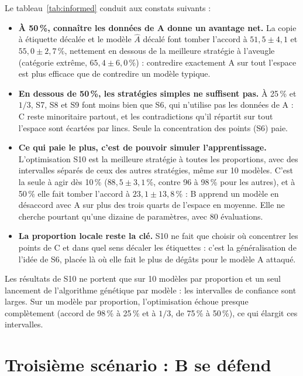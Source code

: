 \documentclass[11pt,a4paper]{article}
\begin{document}
Le tableau~\ref{tab:informed} conduit aux constats suivants :
\begin{itemize}
  \item \textbf{À 50\,\%, connaître les données de A donne un avantage net.} La copie à étiquette décalée et le
        modèle $\hat{A}$ décalé font tomber l'accord à $51{,}5 \pm 4{,}1$ et $55{,}0 \pm 2{,}7$\,\%, nettement en
        dessous de la meilleure stratégie à l'aveugle (catégorie extrême, $65{,}4 \pm 6{,}0$\,\%) : contredire
        exactement A sur tout l'espace est plus efficace que de contredire un modèle typique.
  \item \textbf{En dessous de 50\,\%, les stratégies simples ne suffisent pas.} À 25\,\% et $1/3$, S7, S8 et S9 font
        moins bien que S6, qui n'utilise pas les données de A : C reste minoritaire partout, et les contradictions
        qu'il répartit sur tout l'espace sont écartées par lincs. Seule la concentration des points (S6) paie.
  \item \textbf{Ce qui paie le plus, c'est de pouvoir simuler l'apprentissage.} L'optimisation S10 est la meilleure
        stratégie à toutes les proportions, avec des intervalles séparés de ceux des autres stratégies, même sur
        10 modèles. C'est la seule à agir dès 10\,\% ($88{,}5 \pm 3{,}1$\,\%, contre 96 à 98\,\% pour les autres), et à
        50\,\% elle fait tomber l'accord à $23{,}1 \pm 13{,}8$\,\% : B apprend un modèle en désaccord avec A sur plus
        des trois quarts de l'espace en moyenne. Elle ne cherche pourtant qu'une dizaine de paramètres, avec 80
        évaluations.
  \item \textbf{La proportion locale reste la clé.} S10 ne fait que choisir où concentrer les points de C et dans
        quel sens décaler les étiquettes : c'est la généralisation de l'idée de S6, placée là où elle fait le plus
        de dégâts pour le modèle A attaqué.
\end{itemize}
Les résultats de S10 ne portent que sur 10 modèles par proportion et un seul lancement de l'algorithme génétique
par modèle : les intervalles de confiance sont larges. Sur un modèle par proportion, l'optimisation échoue
presque complètement (accord de 98\,\% à 25\,\% et à $1/3$, de 75\,\% à 50\,\%), ce qui élargit ces intervalles.

\section{Troisième scénario : B se défend}
\end{document}

